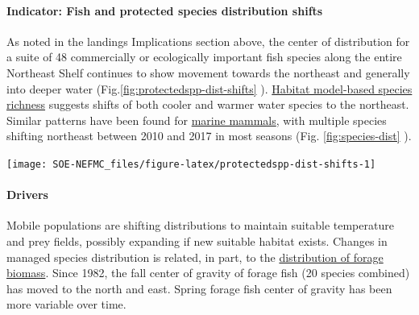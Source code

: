 \documentclass[
  10pt,
]{article}
\let\origfigure\figure
\let\endorigfigure\endfigure
\renewenvironment{figure}[1][2] {
    \expandafter\origfigure\expandafter[H]
} {
    \endorigfigure
}
\begin{document}
\hypertarget{indicator-fish-and-protected-species-distribution-shifts}{%
\paragraph{Indicator: Fish and protected species distribution shifts}\label{indicator-fish-and-protected-species-distribution-shifts}}

As noted in the landings Implications section above, the center of distribution for a suite of 48 commercially or ecologically important fish species along the entire Northeast Shelf continues to show movement towards the northeast and generally into deeper water (Fig.\ref{fig:protectedspp-dist-shifts} ). \href{https://noaa-edab.github.io/catalog/species-richness.html}{Habitat model-based species richness} suggests shifts of both cooler and warmer water species to the northeast. Similar patterns have been found for \href{https://noaa-edab.github.io/catalog/cetacean-distribution-shifts.html}{marine mammals}, with multiple species shifting northeast between 2010 and 2017 in most seasons (Fig. \ref{fig:species-dist} ).

\begin{figure}

{\centering \texttt{[image: SOE-NEFMC\_files/figure-latex/protectedspp-dist-shifts-1]} 

}

\caption{Direction and magnitude of core habitat shifts, represented by the length of the line of the seasonal weighted centroid for species with more than 70 km difference between 2010 and 2017 (tip of arrow).}\label{fig:protectedspp-dist-shifts}
\end{figure}

\hypertarget{drivers}{%
\paragraph{Drivers}\label{drivers}}

Mobile populations are shifting distributions to maintain suitable temperature and prey fields, possibly expanding if new suitable habitat exists. Changes in managed species distribution is related, in part, to the \href{https://noaa-edab.github.io/catalog/forage-fish-index.html}{distribution of forage biomass}. Since 1982, the fall center of gravity of forage fish (20 species combined) has moved to the north and east. Spring forage fish center of gravity has been more variable over time.
\end{document}
